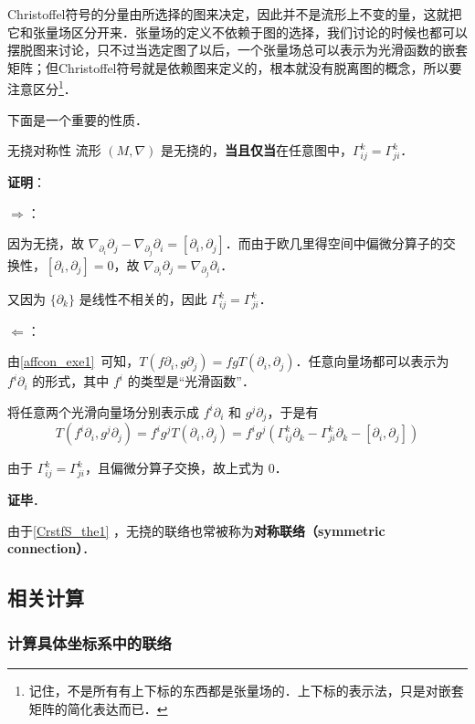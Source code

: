 Christoffel符号的分量由所选择的图来决定，因此并不是流形上不变的量，这就把它和张量场区分开来．张量场的定义不依赖于图的选择，我们讨论的时候也都可以摆脱图来讨论，只不过当选定图了以后，一个张量场总可以表示为光滑函数的嵌套矩阵；但Christoffel符号就是依赖图来定义的，根本就没有脱离图的概念，所以要注意区分\footnote{记住，不是所有有上下标的东西都是张量场的．上下标的表示法，只是对嵌套矩阵的简化表达而已．}．


下面是一个重要的性质．

\begin{theorem}{无挠对称性}\label{CrstfS_the1}
流形 $(M, \nabla)$ 是无挠的，\textbf{当且仅当}在任意图中，$\Gamma^k_{ij}=\Gamma^k_{ji}$．
\end{theorem}

\textbf{证明}：

$\Rightarrow$：

因为无挠，故 $\nabla_{\partial_i}\partial_j-\nabla_{\partial_j}\partial_i=[\partial_i, \partial_j]$．而由于欧几里得空间中偏微分算子的交换性，$[\partial_i, \partial_j]=0$，故 $\nabla_{\partial_i}\partial_j=\nabla_{\partial_j}\partial_i$．

又因为 $\{\partial_k\}$ 是线性不相关的，因此 $\Gamma^k_{ij}=\Gamma^k_{ji}$．

$\Leftarrow$：

由\autoref{affcon_exe1}~可知，$T(f\partial_i, g\partial_j)=fgT(\partial_i, \partial_j)$．任意向量场都可以表示为 $f^i\partial_i$ 的形式，其中 $f^i$ 的类型是“光滑函数”．

将任意两个光滑向量场分别表示成 $f^i\partial_i$ 和 $g^j\partial_j$，于是有
\begin{equation}
T(f^i\partial_i, g^j\partial_j)=f^ig^jT(\partial_i, \partial_j)=f^ig^j(\Gamma^k_{ij}\partial_k-\Gamma^k_{ji}\partial_k-[\partial_i, \partial_j])
\end{equation}

由于 $\Gamma^k_{ij}=\Gamma^k_{ji}$，且偏微分算子交换，故上式为 $0$．

\textbf{证毕}．

由于\autoref{CrstfS_the1} ，无挠的联络也常被称为\textbf{对称联络（symmetric connection）}．


\subsection{相关计算}

\subsubsection{计算具体坐标系中的联络}

